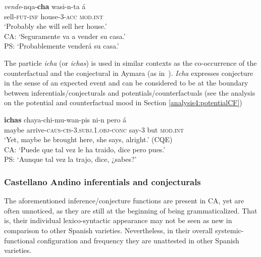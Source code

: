 \documentclass[output=paper,hidelinks]{langscibook}
\begin{document}
\ea \label{ex:Quechua-cha}
\gll \textit{vende}-nqa-\textbf{cha} wasi-n-ta á \\
sell-\textsc{fut-inf} house-\textsc{3-acc} \textsc{mod.int} \\ 
\glt ‘Probably she will sell her house.’\\
CA: `Seguramente va a vender su casa.'\\
PS: `Probablemente venderá su casa.'
\z






The particle \textit{icha} (or \textit{ichas}) is used in similar contexts as the co-occurrence of the
counterfactual and the conjectural in Aymara (as in~). \textit{Icha} expresses conjecture
in the sense of an expected event and can be considered to be at the boundary between
inferentials/conjecturals and potentials/counterfactuals (see the analysis on the potential and counterfactual mood in Section \ref{analysis4:potentialCF})

\ea
\gll \textbf{ichas} chaya-chi-mu-wan-pis ni-n pero á \\
maybe arrive-\textsc{caus-cis-3.subj.1.obj-conc} say-\textsc{3} but \textsc{mod.int} \\ 
\glt `Yet, maybe he brought here, she says, alright.' (CQE)\\
CA: `Puede que tal vez le ha traido, dice pero pues.'\\
PS: `Aunque tal vez la trajo, dice, ¿sabes?'
\z

\subsubsection{Castellano Andino inferentials and conjecturals}
The aforementioned inference/conjecture functions are present in CA, yet are often unnoticed, as they are still at the beginning of being grammaticalized. That is, their individual lexico-syntactic appearance may not be seen as new in comparison to other Spanish varieties. Nevertheless, in their overall systemic-functional configuration and frequency they are unattested in other Spanish varieties.
\end{document}
